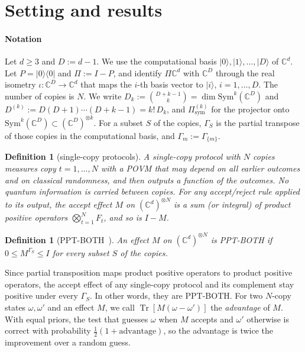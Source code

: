\documentclass[pdflatex,sn-mathphys-num]{sn-jnl}%
\theoremstyle{thmstyleone}
\theoremstyle{thmstylethree}
\newtheorem{definition}[theorem]{Definition}
\theoremstyle{thmstyletwo}
\newcommand{\Tr}{\operatorname{Tr}}
\newcommand{\ket}[1]{|#1\rangle}
\newcommand{\bra}[1]{\langle #1|}
\newcommand{\sym}{\mathrm{sym}}
\newcommand{\C}{\mathbb{C}}
\begin{document}
\section{Setting and results}\label{sec:setting}

\paragraph{Notation} Let $d\ge3$ and $D:=d-1$. We use the computational basis $\ket0,\ket1,\dots,\ket D$ of $\C^d$. Let
$P=\ket0\bra0$ and $\Pi:=I-P$, and identify $\Pi\C^d$ with $\C^D$ through the real isometry $\iota:\C^D\to\C^d$ that
maps the $i$-th basis vector to $\ket i$, $i=1,\dots,D$. The number of copies is $N$. We write
$D_k:=\binom{D+k-1}{k}=\dim\mathrm{Sym}^k(\C^D)$ and $D^{(k)}:=D(D+1)\cdots(D+k-1)=k!\,D_k$, and $\Pi^{(k)}_\sym$ for
the projector onto $\mathrm{Sym}^k(\C^D)\subset(\C^D)^{\otimes k}$. For a subset $S$ of the copies, $\Gamma_S$ is the
partial transpose of those copies in the computational basis, and $\Gamma_m:=\Gamma_{\{m\}}$.

\begin{definition}[single-copy protocols]\label{def:single}
A \emph{single-copy protocol} with $N$ copies measures copy $t=1,\dots,N$ with a POVM that may depend on all earlier
outcomes and on classical randomness, and then outputs a function of the outcomes. No quantum information is carried
between copies. For any accept/reject rule applied to its output, the accept effect $M$ on $(\C^d)^{\otimes N}$ is a
sum (or integral) of product positive operators $\bigotimes_{t=1}^NF_t$, and so is $I-M$.
\end{definition}

\begin{definition}[PPT-BOTH~\cite{ab}]\label{def:ppt}
An effect $M$ on $(\C^d)^{\otimes N}$ is \emph{PPT-BOTH} if $0\le M^{\Gamma_S}\le I$ for every subset $S$ of the copies.
\end{definition}

Since partial transposition maps product positive operators to product positive operators, the accept effect of any
single-copy protocol and its complement stay positive under every $\Gamma_S$. In other words, they are PPT-BOTH. For
two $N$-copy states $\omega,\omega'$ and an effect $M$, we call $\Tr[M(\omega-\omega')]$ the \emph{advantage} of $M$.
With equal priors, the test that guesses $\omega$ when $M$ accepts and $\omega'$ otherwise is correct with probability
$\tfrac12(1+\text{advantage})$, so the advantage is twice the improvement over a random guess.
\end{document}
